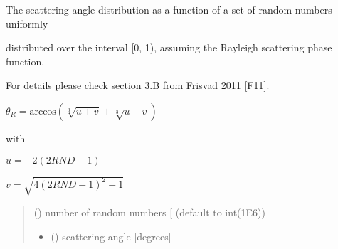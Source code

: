 \documentclass[letterpaper,10pt,english]{sphinxmanual}
\begin{document}

\begin{fulllineitems}
\label{\detokenize{06_anisotropy_factor:skinoptics.anisotropy_factor.theta_R_from_RND}}
\pysigstartsignatures
{}
\pysigstopsignatures
\begin{DUlineblock}{0em}
\item[] The scattering angle distribution as a function of a set of random numbers uniformly
\item[] distributed over the interval {[}0, 1), assuming the Rayleigh scattering phase function.
\item[] For details please check section 3.B from Frisvad 2011 {[}F11{]}.
\end{DUlineblock}

\begin{DUlineblock}{0em}
\item[] \(\theta_{R} = \mbox{arccos}(\sqrt[3]{u + v} + \sqrt[3]{u - v})\)
\item[] with
\item[] \(u = -2(2RND - 1)\)
\item[] \(v = \sqrt{4(2RND - 1)^2 + 1}\)
\end{DUlineblock}
\begin{quote}\begin{description}
\sphinxAtStartPar
{} () \textendash{} number of random numbers {[}\sphinxhyphen{}{]} (default to int(1E6))

\sphinxAtStartPar
\begin{itemize}
\item {} 
\sphinxAtStartPar
{} () \textendash{} scattering angle {[}degrees{]}

\end{itemize}


\end{description}\end{quote}

\end{fulllineitems}
\end{document}
